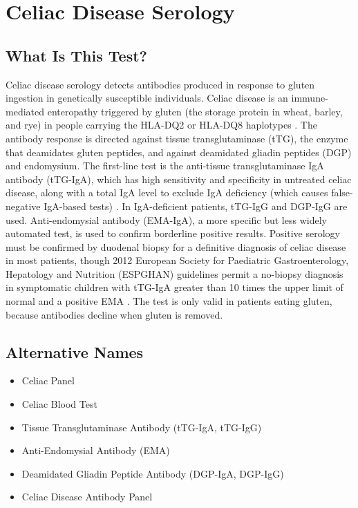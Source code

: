 \chapter{Celiac Disease Serology}

\section*{What Is This Test?}
Celiac disease serology detects antibodies produced in response to gluten ingestion in genetically susceptible individuals. Celiac disease is an immune-mediated enteropathy triggered by gluten (the storage protein in wheat, barley, and rye) in people carrying the HLA-DQ2 or HLA-DQ8 haplotypes \cite{lebwohl2018coeliac}. The antibody response is directed against tissue transglutaminase (tTG), the enzyme that deamidates gluten peptides, and against deamidated gliadin peptides (DGP) and endomysium. The first-line test is the anti-tissue transglutaminase IgA antibody (tTG-IgA), which has high sensitivity and specificity in untreated celiac disease, along with a total IgA level to exclude IgA deficiency (which causes false-negative IgA-based tests) \cite{rubiotapia2013acg}. In IgA-deficient patients, tTG-IgG and DGP-IgG are used. Anti-endomysial antibody (EMA-IgA), a more specific but less widely automated test, is used to confirm borderline positive results. Positive serology must be confirmed by duodenal biopsy for a definitive diagnosis of celiac disease in most patients, though 2012 European Society for Paediatric Gastroenterology, Hepatology and Nutrition (ESPGHAN) guidelines permit a no-biopsy diagnosis in symptomatic children with tTG-IgA greater than 10 times the upper limit of normal and a positive EMA \cite{husby2012espghan}. The test is only valid in patients eating gluten, because antibodies decline when gluten is removed.

\section*{Alternative Names}
\begin{itemize}
  \item Celiac Panel
  \item Celiac Blood Test
  \item Tissue Transglutaminase Antibody (tTG-IgA, tTG-IgG)
  \item Anti-Endomysial Antibody (EMA)
  \item Deamidated Gliadin Peptide Antibody (DGP-IgA, DGP-IgG)
  \item Celiac Disease Antibody Panel
\end{itemize}
